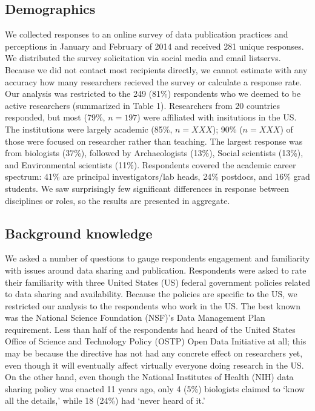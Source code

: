 \documentclass[10pt]{article}
\begin{document}
\subsection*{Demographics}

We collected responses to an online survey of data publication practices and perceptions in January and February of 2014 and received 281 unique responses.
We distributed the survey solicitation via social media and email listservs.
Because we did not contact most recipients directly, we cannot estimate with any accuracy how many researchers recieved the survey or calculate a response rate.
Our analysis was restricted to the 249 (81\%) respondents who we deemed to be active researchers (summarized in Table 1).
Researchers from 20 countries responded, but most (79\%, $n=197$) were affiliated with insitutions in the US.
The institutions were largely academic (85\%, $n=XXX$); 90\% ($n=XXX$) of those were focused on researcher rather than teaching. 
The largest response was from biologists (37\%), followed by Archaeologists (13\%), Social scientists (13\%), and Environmental scientists (11\%).
Respondents covered the academic career spectrum: 41\% are principal investigators/lab heads, 24\% postdocs, and 16\% grad students.
We saw surprisingly few significant differences in response between disciplines or roles, so the results are presented in aggregate.

\subsection*{Background knowledge}

We asked a number of questions to gauge respondents engagement and familiarity with issues around data sharing and publication.
Respondents were asked to rate their familiarity with three United States (US) federal government policies related to data sharing and availability.
Because the policies are specific to the US, we restricted our analysis to the respondents who work in the US.
The best known was the National Science Foundation (NSF)'s Data Management Plan requirement\cite{national_science_foundation_gpg_2011}.
Less than half of the respondents had heard of the United States Office of Science and Technology Policy (OSTP) Open Data Initiative\cite{obama_making_2013} at all; this may be because the directive has not had any concrete effect on researchers yet, even though it will eventually affect virtually everyone doing research in the US.
On the other hand, even though the National Institutes of Health (NIH) data sharing policy\cite{national_institutes_of_health_final_2003} was enacted 11 years ago, only 4 (5\%) biologists claimed to `know all the details,' while 18 (24\%) had `never heard of it.'
\end{document}
